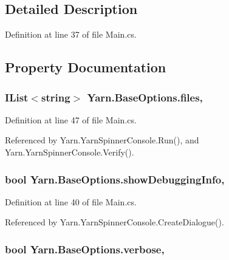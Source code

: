\subsection{Detailed Description}


Definition at line 37 of file Main.\-cs.



\subsection{Property Documentation}
\hypertarget{a00031_aa93cbb1bc1d5328e0a417012621e92d2}{
\subsubsection[{files}]{\setlength{\rightskip}{0pt plus 5cm}I\-List$<$string$>$ Yarn.\-Base\-Options.\-files\hspace{0.3cm}{\ttfamily [get]}, {\ttfamily [set]}}}\label{a00031_aa93cbb1bc1d5328e0a417012621e92d2}


Definition at line 47 of file Main.\-cs.



Referenced by Yarn.\-Yarn\-Spinner\-Console.\-Run(), and Yarn.\-Yarn\-Spinner\-Console.\-Verify().

\hypertarget{a00031_a89964ea17bd19caf00cb5bff563ed01c}{
\subsubsection[{show\-Debugging\-Info}]{\setlength{\rightskip}{0pt plus 5cm}bool Yarn.\-Base\-Options.\-show\-Debugging\-Info\hspace{0.3cm}{\ttfamily [get]}, {\ttfamily [set]}}}\label{a00031_a89964ea17bd19caf00cb5bff563ed01c}


Definition at line 40 of file Main.\-cs.



Referenced by Yarn.\-Yarn\-Spinner\-Console.\-Create\-Dialogue().

\hypertarget{a00031_ada4d83d1756918f362d55f6649b82b17}{
\subsubsection[{verbose}]{\setlength{\rightskip}{0pt plus 5cm}bool Yarn.\-Base\-Options.\-verbose\hspace{0.3cm}{\ttfamily [get]}, {\ttfamily [set]}}}\label{a00031_ada4d83d1756918f362d55f6649b82b17}


